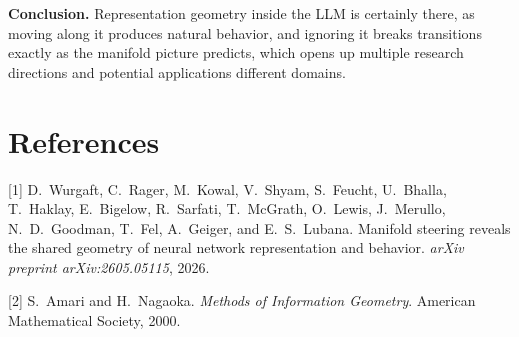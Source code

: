 \documentclass[10pt]{article}
\begin{document}
\textbf{Conclusion.} Representation geometry inside the LLM is certainly there, as moving along
it produces natural behavior, and ignoring it breaks transitions exactly as
the manifold picture predicts, which opens up multiple research directions and potential applications different domains.

\section{References}

{\small
[1] D.~Wurgaft, C.~Rager, M.~Kowal, V.~Shyam, S.~Feucht, U.~Bhalla,
T.~Haklay, E.~Bigelow, R.~Sarfati, T.~McGrath, O.~Lewis, J.~Merullo,
N.~D.~Goodman, T.~Fel, A.~Geiger, and E.~S.~Lubana. Manifold steering
reveals the shared geometry of neural network representation and behavior.
\emph{arXiv preprint arXiv:2605.05115}, 2026.

[2] S.~Amari and H.~Nagaoka. \emph{Methods of Information Geometry}.
American Mathematical Society, 2000.}
\end{document}
